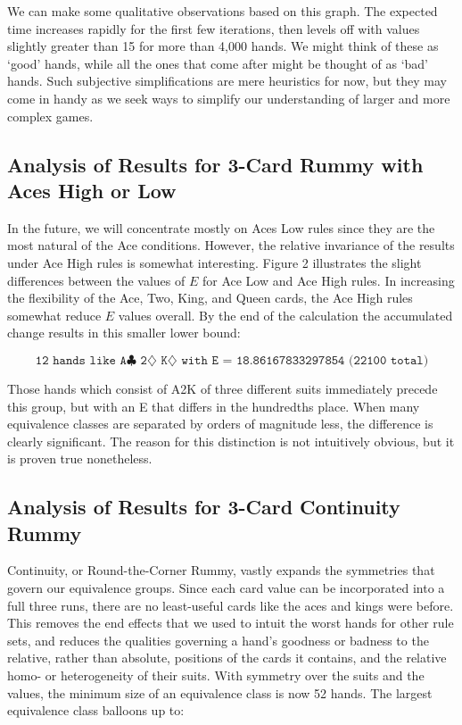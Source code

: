 \documentclass[paper=a4, fontsize=11pt,twoside]{report}   %
\begin{document}
We can make some qualitative observations based on this graph. The expected time increases rapidly for the first few iterations, then levels off with values slightly greater than 15 for more than 4,000 hands. We might think of these as ‘good’ hands, while all the ones that come after might be thought of as ‘bad’ hands. Such subjective simplifications are mere heuristics for now, but they may come in handy as we seek ways to simplify our understanding of larger and more complex games. 

\subsection{Analysis of Results for 3-Card Rummy with Aces High or Low}

In the future, we will concentrate mostly on Aces Low rules since they are the most natural of the Ace conditions. However, the relative invariance of the results under Ace High rules is somewhat interesting. Figure 2 illustrates the slight differences between the values of $E$ for Ace Low and Ace High rules. In increasing the flexibility of the Ace, Two, King, and Queen cards, the Ace High rules somewhat reduce $E$ values overall. By the end of the calculation the accumulated change results in this smaller lower bound:

$$\texttt{12 hands like A$\clubsuit$ 2$\diamondsuit$ K$\diamondsuit$ with E = 18.86167833297854 (22100 total)}$$

Those hands which consist of A2K of three different suits immediately precede this group, but with an E that differs in the hundredths place. When many equivalence classes are separated by orders of magnitude less, the difference is clearly significant. The reason for this distinction is not intuitively obvious, but it is proven true nonetheless. 

\subsection{Analysis of Results for 3-Card Continuity Rummy}

Continuity, or Round-the-Corner Rummy, vastly expands the symmetries that govern our equivalence groups. Since each card value can be incorporated into a full three runs, there are no least-useful cards like the aces and kings were before. This removes the end effects that we used to intuit the worst hands for other rule sets, and reduces the qualities governing a hand’s goodness or badness to the relative, rather than absolute, positions of the cards it contains, and the relative homo- or heterogeneity of their suits. With symmetry over the suits and the values, the minimum size of an equivalence class is now 52 hands. The largest equivalence class balloons up to: 
\end{document}
